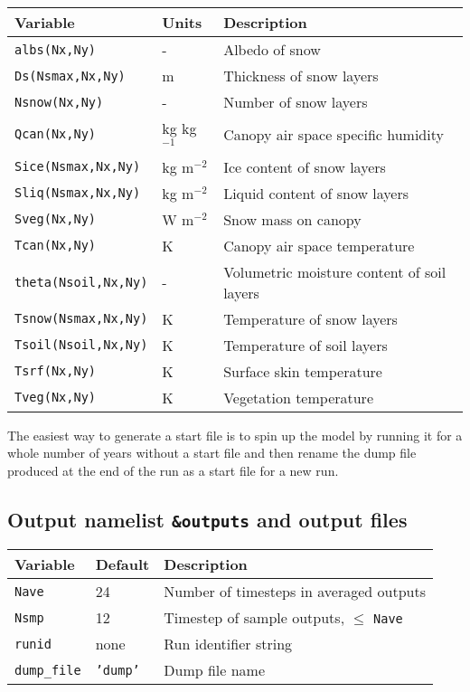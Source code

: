 \documentclass{article}
\begin{document}
\begin{tabular}{|l|l|l|}
\hline
Variable & Units & Description \\
\hline
{\tt albs(Nx,Ny)}        & -            & Albedo of snow                             \\
{\tt Ds(Nsmax,Nx,Ny)}    & m            & Thickness of snow layers                   \\
{\tt Nsnow(Nx,Ny)}       & -            & Number of snow layers                      \\
{\tt Qcan(Nx,Ny)}        & kg kg$^{-1}$ & Canopy air space specific humidity         \\
{\tt Sice(Nsmax,Nx,Ny)}  & kg m$^{-2}$  & Ice content of snow layers                 \\
{\tt Sliq(Nsmax,Nx,Ny)}  & kg m$^{-2}$  & Liquid content of snow layers              \\
{\tt Sveg(Nx,Ny)}        & W m$^{-2}$   & Snow mass on canopy                        \\
{\tt Tcan(Nx,Ny)}        & K            & Canopy air space temperature               \\
{\tt theta(Nsoil,Nx,Ny)} & -            & Volumetric moisture content of soil layers \\
{\tt Tsnow(Nsmax,Nx,Ny)} & K            & Temperature of snow layers                 \\
{\tt Tsoil(Nsoil,Nx,Ny)} & K            & Temperature of soil layers                 \\
{\tt Tsrf(Nx,Ny)}        & K            & Surface skin temperature                   \\
{\tt Tveg(Nx,Ny)}        & K            & Vegetation temperature                     \\
\hline 
\end{tabular}

The easiest way to generate a start file is to spin up the model by running it for a whole number of years without a start file and then rename the dump file produced at the end of the run as a start file for a new run.

\subsection*{Output namelist {\tt \&outputs} and output files}

\begin{tabular}{|l|l|l|}
\hline
Variable & Default & Description \\
\hline
{\tt Nave}       & 24           & Number of timesteps in averaged outputs       \\
{\tt Nsmp}       & 12           & Timestep of sample outputs, $\leq$ {\tt Nave} \\
{\tt runid}      & none         & Run identifier string                         \\
{\tt dump\_file} & {\tt 'dump'} & Dump file name                                \\
\hline 
\end{tabular}
\end{document}

